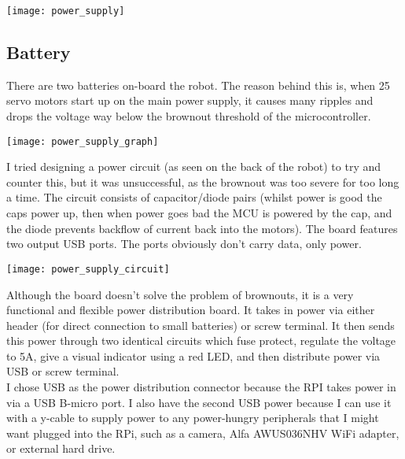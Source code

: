 				\texttt{[image: power\_supply]}
			
			\subsection{Battery}
            	There are two batteries on-board the robot. The reason behind this is, when 25 servo motors start up on the main power supply, it causes many ripples and drops the voltage way below the brownout threshold of the microcontroller.\\
                
                \centerline{\texttt{[image: power\_supply\_graph]}}
                \vspace{10pt}
                
                I tried designing a power circuit (as seen on the back of the robot) to try and counter this, but it was unsuccessful, as the brownout was too severe for too long a time. The circuit consists of capacitor/diode pairs (whilst power is good the caps power up, then when power goes bad the MCU is powered by the cap, and the diode prevents backflow of current back into the motors). The board features two output USB ports. The ports obviously don't carry data, only power.\\                                                
                \centerline{\texttt{[image: power\_supply\_circuit]}}
                \vspace{10pt}
                
                Although the board doesn't solve the problem of brownouts, it is a very functional and flexible power distribution board. It takes in power via either header (for direct connection to small batteries) or screw terminal. It then sends this power through two identical circuits which fuse protect, regulate the voltage to 5A, give a visual indicator using a red LED, and then distribute power via USB or screw terminal.\\
                
                I chose USB as the power distribution connector because the RPI takes power in via a USB B-micro port. I also have the second USB power because I can use it with a y-cable to supply power to any power-hungry peripherals that I might want plugged into the RPi, such as a camera, Alfa AWUS036NHV WiFi adapter, or external hard drive.\\
                
